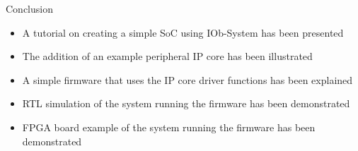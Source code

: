 \documentclass [xcolor=svgnames, t] {beamer}
\begin{document}
\begin{frame}{Conclusion}
  \begin{itemize}
  \item A tutorial on creating a simple SoC using IOb-System has been presented
  \item The addition of an example peripheral IP core has been illustrated
  \item A simple firmware that uses the IP core driver functions has been explained
  \item RTL simulation of the system running the firmware has been demonstrated
  \item FPGA board example of the system running the firmware has been demonstrated
  \end{itemize}
\end{frame}

\end{document}
